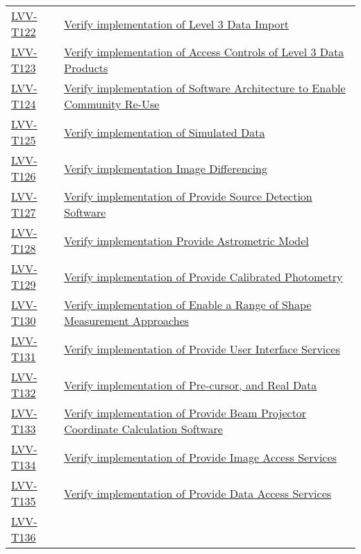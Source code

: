 \begin{longtable}[]{p{3cm}p{13cm}}
    \hyperref[lvv-t122]{LVV-T122} &
    \href{https://jira.lsstcorp.org/secure/Tests.jspa\#/testCase/LVV-T122}{Verify implementation of Level 3 Data Import} \tabularnewline
    \hyperref[lvv-t123]{LVV-T123} &
    \href{https://jira.lsstcorp.org/secure/Tests.jspa\#/testCase/LVV-T123}{Verify implementation of Access Controls of Level 3 Data Products} \tabularnewline
    \hyperref[lvv-t124]{LVV-T124} &
    \href{https://jira.lsstcorp.org/secure/Tests.jspa\#/testCase/LVV-T124}{Verify implementation of  Software Architecture to Enable Community Re-Use} \tabularnewline
    \hyperref[lvv-t125]{LVV-T125} &
    \href{https://jira.lsstcorp.org/secure/Tests.jspa\#/testCase/LVV-T125}{Verify implementation of Simulated Data} \tabularnewline
    \hyperref[lvv-t126]{LVV-T126} &
    \href{https://jira.lsstcorp.org/secure/Tests.jspa\#/testCase/LVV-T126}{Verify implementation  Image Differencing} \tabularnewline
    \hyperref[lvv-t127]{LVV-T127} &
    \href{https://jira.lsstcorp.org/secure/Tests.jspa\#/testCase/LVV-T127}{Verify implementation of Provide Source Detection Software} \tabularnewline
    \hyperref[lvv-t128]{LVV-T128} &
    \href{https://jira.lsstcorp.org/secure/Tests.jspa\#/testCase/LVV-T128}{Verify implementation Provide Astrometric Model} \tabularnewline
    \hyperref[lvv-t129]{LVV-T129} &
    \href{https://jira.lsstcorp.org/secure/Tests.jspa\#/testCase/LVV-T129}{Verify implementation of Provide Calibrated Photometry} \tabularnewline
    \hyperref[lvv-t130]{LVV-T130} &
    \href{https://jira.lsstcorp.org/secure/Tests.jspa\#/testCase/LVV-T130}{Verify implementation of Enable a Range of Shape Measurement Approaches} \tabularnewline
    \hyperref[lvv-t131]{LVV-T131} &
    \href{https://jira.lsstcorp.org/secure/Tests.jspa\#/testCase/LVV-T131}{Verify implementation of Provide User Interface Services} \tabularnewline
    \hyperref[lvv-t132]{LVV-T132} &
    \href{https://jira.lsstcorp.org/secure/Tests.jspa\#/testCase/LVV-T132}{Verify implementation of Pre-cursor, and Real Data} \tabularnewline
    \hyperref[lvv-t133]{LVV-T133} &
    \href{https://jira.lsstcorp.org/secure/Tests.jspa\#/testCase/LVV-T133}{Verify implementation of Provide Beam Projector Coordinate Calculation Software} \tabularnewline
    \hyperref[lvv-t134]{LVV-T134} &
    \href{https://jira.lsstcorp.org/secure/Tests.jspa\#/testCase/LVV-T134}{Verify implementation of Provide Image Access Services} \tabularnewline
    \hyperref[lvv-t135]{LVV-T135} &
    \href{https://jira.lsstcorp.org/secure/Tests.jspa\#/testCase/LVV-T135}{Verify implementation of Provide Data Access Services} \tabularnewline
    \hyperref[lvv-t136]{LVV-T136} &

\end{longtable}
